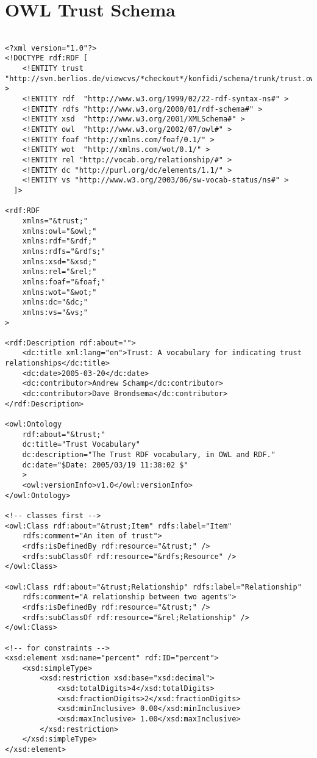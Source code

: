 \documentclass{acm_proc_article-sp}
\begin{document}
\onecolumn

\appendix

\section{OWL Trust Schema}
\label{schemaCode}

\begin{verbatim}

<?xml version="1.0"?>
<!DOCTYPE rdf:RDF [
    <!ENTITY trust "http://svn.berlios.de/viewcvs/*checkout*/konfidi/schema/trunk/trust.owl#" >
    <!ENTITY rdf  "http://www.w3.org/1999/02/22-rdf-syntax-ns#" >
    <!ENTITY rdfs "http://www.w3.org/2000/01/rdf-schema#" >
    <!ENTITY xsd  "http://www.w3.org/2001/XMLSchema#" >
    <!ENTITY owl  "http://www.w3.org/2002/07/owl#" >
    <!ENTITY foaf "http://xmlns.com/foaf/0.1/" >
    <!ENTITY wot  "http://xmlns.com/wot/0.1/" >
    <!ENTITY rel "http://vocab.org/relationship/#" >
    <!ENTITY dc "http://purl.org/dc/elements/1.1/" >
    <!ENTITY vs "http://www.w3.org/2003/06/sw-vocab-status/ns#" >
  ]>

<rdf:RDF 
    xmlns="&trust;"
    xmlns:owl="&owl;" 
    xmlns:rdf="&rdf;" 
    xmlns:rdfs="&rdfs;"
    xmlns:xsd="&xsd;"
    xmlns:rel="&rel;"
    xmlns:foaf="&foaf;"
    xmlns:wot="&wot;"
    xmlns:dc="&dc;"
    xmlns:vs="&vs;"
>

<rdf:Description rdf:about="">
    <dc:title xml:lang="en">Trust: A vocabulary for indicating trust relationships</dc:title>
    <dc:date>2005-03-20</dc:date>
    <dc:contributor>Andrew Schamp</dc:contributor>
    <dc:contributor>Dave Brondsema</dc:contributor>
</rdf:Description>

<owl:Ontology 
    rdf:about="&trust;" 
    dc:title="Trust Vocabulary" 
    dc:description="The Trust RDF vocabulary, in OWL and RDF." 
    dc:date="$Date: 2005/03/19 11:38:02 $"
    > 
    <owl:versionInfo>v1.0</owl:versionInfo>
</owl:Ontology>

<!-- classes first -->
<owl:Class rdf:about="&trust;Item" rdfs:label="Item" 
    rdfs:comment="An item of trust">
    <rdfs:isDefinedBy rdf:resource="&trust;" />
    <rdfs:subClassOf rdf:resource="&rdfs;Resource" />
</owl:Class>

<owl:Class rdf:about="&trust;Relationship" rdfs:label="Relationship"
    rdfs:comment="A relationship between two agents">
    <rdfs:isDefinedBy rdf:resource="&trust;" />
    <rdfs:subClassOf rdf:resource="&rel;Relationship" />
</owl:Class>

<!-- for constraints -->
<xsd:element xsd:name="percent" rdf:ID="percent">
    <xsd:simpleType>
        <xsd:restriction xsd:base="xsd:decimal">
            <xsd:totalDigits>4</xsd:totalDigits>
            <xsd:fractionDigits>2</xsd:fractionDigits>
            <xsd:minInclusive> 0.00</xsd:minInclusive>
            <xsd:maxInclusive> 1.00</xsd:maxInclusive>
        </xsd:restriction>
    </xsd:simpleType>
</xsd:element>


\end{verbatim}
\end{document}
